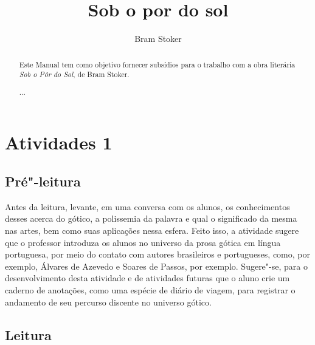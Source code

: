 \documentclass[12pt]{extarticle}
\begin{document}
\newcommand{\AutorLivro}{Bram Stoker}
\newcommand{\TituloLivro}{Sob o por do sol}
\newcommand{\Tema}{Ficção, mistério e fantasia}
\newcommand{\Genero}{Romance}
\newcommand{\issnppub}{---}
\newcommand{\issnepub}{---}
\newcommand{\colaborador}{\textbf{Michelle Etienne Florence, Bruno Gradella e Vicente Castro} é uma pessoa incrível e vai fazer um bom serviço.}


\title{\TituloLivro}
\author{\AutorLivro}
\def\authornotes{\colaborador}

\date{}
\maketitle

\begin{abstract}
Este Manual tem como objetivo fornecer subsídios para o trabalho com a
obra literária \emph{Sob o Pôr do Sol}, de Bram Stoker.

...
\end{abstract}

\tableofcontents


\section{Atividades 1}


\subsection{Pré"-leitura}


Antes da leitura, levante, em uma conversa com os alunos, os
conhecimentos desses acerca do gótico, a polissemia da palavra e qual o
significado da mesma nas artes, bem como suas aplicações nessa esfera.
Feito isso, a atividade sugere que o professor introduza os alunos no
universo da prosa gótica em língua portuguesa, por meio do contato com
autores brasileiros e portugueses, como, por exemplo, Álvares de Azevedo
e Soares de Passos, por exemplo. Sugere"-se, para o desenvolvimento desta
atividade e de atividades futuras que o aluno crie um caderno de
anotações, como uma espécie de diário de viagem, para registrar o
andamento de seu percurso discente no universo gótico.

\subsection{Leitura}
\end{document}
